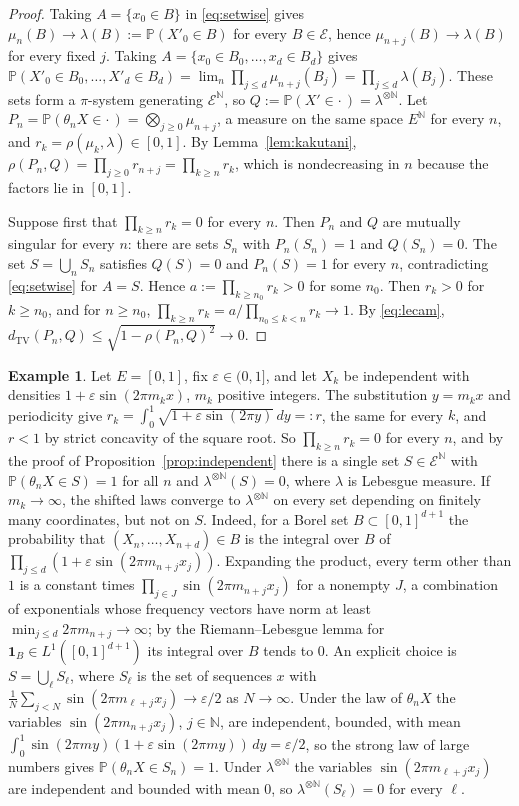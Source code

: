 \documentclass[11pt]{amsart}
\theoremstyle{definition}
\newtheorem{example}[theorem]{Example}
\theoremstyle{remark}
\newcommand{\N}{\mathbb N}
\newcommand{\Prob}{\mathbb P}
\newcommand{\cE}{\mathcal E}
\newcommand{\dtv}{d_{\mathrm{TV}}}
\newcommand{\one}{\mathbf 1}
\begin{document}
\begin{proof}
Taking $A=\{x_0\in B\}$ in \eqref{eq:setwise} gives $\mu_n(B)\to\lambda(B):=\Prob(X'_0\in B)$ for every $B\in\cE$, hence
$\mu_{n+j}(B)\to\lambda(B)$ for every fixed $j$. Taking $A=\{x_0\in B_0,\dots,x_d\in B_d\}$ gives
$\Prob(X'_0\in B_0,\dots,X'_d\in B_d)=\lim_n\prod_{j\le d}\mu_{n+j}(B_j)=\prod_{j\le d}\lambda(B_j)$. These sets form a
$\pi$-system generating $\cE^\N$, so $Q:=\Prob(X'\in\cdot\,)=\lambda^{\otimes\N}$. Let
$P_n=\Prob(\theta_nX\in\cdot\,)=\bigotimes_{j\ge0}\mu_{n+j}$, a measure on the same space $E^\N$ for every $n$,
and $r_k=\rho(\mu_k,\lambda)\in[0,1]$. By Lemma~\ref{lem:kakutani}, $\rho(P_n,Q)=\prod_{j\ge0}r_{n+j}=\prod_{k\ge
n}r_k$, which is nondecreasing in $n$ because the factors lie in $[0,1]$.

Suppose first that $\prod_{k\ge n}r_k=0$ for every $n$. Then $P_n$ and $Q$ are mutually singular for every $n$: there
are sets $S_n$ with $P_n(S_n)=1$ and $Q(S_n)=0$. The set $S=\bigcup_nS_n$ satisfies $Q(S)=0$ and $P_n(S)=1$ for every
$n$, contradicting \eqref{eq:setwise} for $A=S$. Hence $a:=\prod_{k\ge n_0}r_k>0$ for some $n_0$. Then $r_k>0$ for
$k\ge n_0$, and for $n\ge n_0$, $\prod_{k\ge n}r_k=a/\prod_{n_0\le k<n}r_k\to1$. By \eqref{eq:lecam},
$\dtv(P_n,Q)\le\sqrt{1-\rho(P_n,Q)^2}\to0$.
\end{proof}

\begin{example}\label{ex:oscillating}
Let $E=[0,1]$, fix $\varepsilon\in(0,1]$, and let $X_k$ be independent with densities $1+\varepsilon\sin(2\pi m_kx)$,
$m_k$ positive integers. The substitution $y=m_kx$ and periodicity give
$r_k=\int_0^1\sqrt{1+\varepsilon\sin(2\pi y)}\,dy=:r$, the same for every $k$, and $r<1$ by strict concavity of the
square root. So $\prod_{k\ge n}r_k=0$ for every $n$, and by the proof of Proposition~\ref{prop:independent} there is a
single set $S\in\cE^\N$ with $\Prob(\theta_nX\in S)=1$ for all $n$ and $\lambda^{\otimes\N}(S)=0$, where $\lambda$ is
Lebesgue measure. If $m_k\to\infty$, the shifted laws converge to $\lambda^{\otimes\N}$ on every set depending on
finitely many coordinates, but not on $S$. Indeed, for a Borel set $B\subset[0,1]^{d+1}$ the probability that
$(X_n,\dots,X_{n+d})\in B$ is the integral over $B$ of $\prod_{j\le d}(1+\varepsilon\sin(2\pi m_{n+j}x_j))$.
Expanding the product, every term other than $1$ is a constant times
$\prod_{j\in J}\sin(2\pi m_{n+j}x_j)$ for a nonempty $J$, a combination of exponentials whose frequency vectors
have norm at least $\min_{j\le d}2\pi m_{n+j}\to\infty$; by the Riemann--Lebesgue lemma for $\one_B\in
L^1([0,1]^{d+1})$ its integral over $B$ tends to $0$. An explicit choice is $S=\bigcup_\ell S_\ell$, where
$S_\ell$ is the set of sequences $x$ with $\frac1N\sum_{j<N}\sin(2\pi m_{\ell+j}x_j)\to\varepsilon/2$ as $N\to\infty$. Under
the law of $\theta_nX$ the variables $\sin(2\pi m_{n+j}x_j)$, $j\in\N$, are independent, bounded, with mean
$\int_0^1\sin(2\pi m y)(1+\varepsilon\sin(2\pi my))\,dy=\varepsilon/2$, so the strong law of large numbers gives
$\Prob(\theta_nX\in S_n)=1$. Under $\lambda^{\otimes\N}$ the variables $\sin(2\pi m_{\ell+j}x_j)$ are independent and
bounded with mean $0$, so $\lambda^{\otimes\N}(S_\ell)=0$ for every $\ell$.
\end{example}
\end{document}
